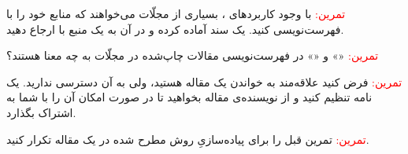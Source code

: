 \documentclass{article}
\begin{document}
\noindent \textcolor{red}{تمرین:} با وجود کاربردهای ، بسیاری از مجلّات می‌خواهند که منابع خود را با \href{https://www.overleaf.com/learn/latex/Bibliography_management_with_bibtex?&nocdn=true}{} فهرست‌نویسی کنید. یک سند آماده کرده و در آن به یک منبع با \href{https://www.overleaf.com/learn/latex/Bibliography_management_with_bibtex?&nocdn=true}{} ارجاع دهید.

\noindent \textcolor{red}{تمرین:} «» و «» در فهرست‌نویسی مقالات چاپ‌شده در مجلّات به چه معنا هستند؟

\noindent \textcolor{red}{تمرین:} فرض کنید علاقه‌مند به خواندن یک مقاله هستید، ولی به آن دسترسی ندارید. یک نامه تنظیم کنید و از نویسنده‌ی مقاله بخواهید تا در صورت امکان آن را با شما به اشتراک بگذارد.

\noindent \textcolor{red}{تمرین:} تمرین قبل را برای پیاده‌سازیِ روش مطرح شده در یک مقاله تکرار کنید.


\end{document}
